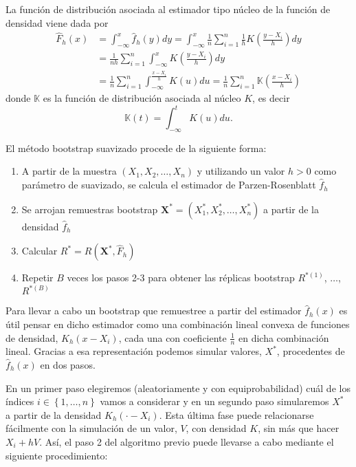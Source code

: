 \documentclass[
]{book}
\theoremstyle{definition}
\theoremstyle{definition}
\theoremstyle{definition}
\theoremstyle{remark}
\begin{document}
La función de distribución asociada al estimador tipo núcleo de la
función de densidad viene dada por
\[\begin{aligned}
\hat{F}_{h}\left( x \right) &= \int_{-\infty }^{x}\hat{f}_{h}\left( y \right) dy
=\int_{-\infty }^{x}\frac{1}{n}\sum_{i=1}^{n}\frac{1}{h}
K\left( \frac{y-X_i}{h} \right) dy \\
&= \frac{1}{nh}\sum_{i=1}^{n}\int_{-\infty }^{x}
K\left( \frac{y-X_i}{h} \right) dy \\
&= \frac{1}{n}\sum_{i=1}^{n}\int_{-\infty }^{\frac{x-X_i}{h}}K\left( u \right) du
=\frac{1}{n}\sum_{i=1}^{n}\mathbb{K}\left( \frac{x-X_i}{h} \right)
\end{aligned}\]
donde \(\mathbb{K}\) es la función de distribución
asociada al núcleo \(K\), es decir
\[\mathbb{K}\left( t \right) =\int_{-\infty }^{t}K\left(
u \right) du.\]

El método bootstrap suavizado procede de la siguiente forma:

\begin{enumerate}
\def\labelenumi{\arabic{enumi}.}
\item
  A partir de la muestra \(\left( X_1,X_2,\ldots ,X_n \right)\) y
  utilizando un valor \(h>0\) como parámetro de suavizado, se calcula el
  estimador de Parzen-Rosenblatt \(\hat{f}_{h}\)
\item
  Se arrojan remuestras bootstrap \(\mathbf{X}^{\ast}=\left( X_1^{\ast},X_2^{\ast},\ldots ,X_n^{\ast} \right)\) a partir de
  la densidad \(\hat{f}_{h}\)
\item
  Calcular
  \(R^{\ast}=R\left( \mathbf{X}^{\ast},\hat{F}_{h} \right)\)
\item
  Repetir \(B\) veces los pasos 2-3 para obtener las réplicas bootstrap
  \(R^{\ast (1)}\), \(\ldots\), \(R^{\ast (B)}\)
\end{enumerate}

Para llevar a cabo un bootstrap que remuestree a partir del estimador
\(\hat{f}_{h}\left( x \right)\) es útil pensar en dicho estimador como una
combinación lineal convexa de funciones de densidad, \(K_{h}\left( x-X_i \right)\), cada una con coeficiente \(\frac{1}{n}\) en dicha
combinación lineal. Gracias a esa representación podemos simular
valores,
\(X^{\ast}\), procedentes de \(\hat{f}_{h}\left( x \right)\) en dos pasos.

En un primer paso elegiremos (aleatoriamente y con equiprobabilidad)
cuál de los índices \(i\in \left\{ 1,\ldots ,n\right\}\) vamos a
considerar y en un segundo paso simularemos \(X^{\ast}\) a partir de la
densidad \(K_{h}\left( \cdot -X_i \right)\). Esta última fase puede relacionarse fácilmente
con la simulación de un valor, \(V\), con densidad \(K\), sin más que hacer
\(X_i+hV\). Así, el paso 2 del algoritmo previo puede llevarse a cabo
mediante el siguiente procedimiento:
\end{document}
